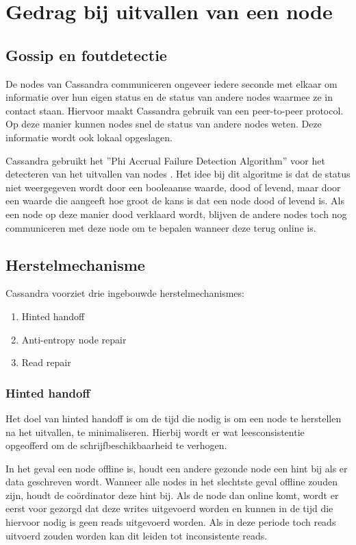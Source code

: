 \chapter{Gedrag bij uitvallen van een node}
\label{ch:cassandra_uitval}

\section{Gossip en foutdetectie}
De nodes van Cassandra communiceren ongeveer iedere seconde met elkaar om informatie over hun eigen status en de status van andere nodes waarmee ze in contact staan.
Hiervoor maakt Cassandra gebruik van een peer-to-peer protocol.
Op deze manier kunnen nodes snel de status van andere nodes weten.
Deze informatie wordt ook lokaal opgeslagen.

Cassandra gebruikt het ''Phi Accrual Failure Detection Algorithm'' voor het detecteren van het uitvallen van nodes \citep{kan2014cassandra}.
Het idee bij dit algoritme is dat de status niet weergegeven wordt door een booleaanse waarde, dood of levend, maar door een waarde die aangeeft hoe groot de kans is dat een node dood of levend is.
Als een node op deze manier dood verklaard wordt, blijven de andere nodes toch nog communiceren met deze node om te bepalen wanneer deze terug online is.

\section{Herstelmechanisme}
Cassandra voorziet drie ingebouwde herstelmechanismes:

\begin{enumerate}
	\item Hinted handoff
	\item Anti-entropy node repair
	\item Read repair
\end{enumerate}

\subsection{Hinted handoff}
Het doel van hinted handoff is om de tijd die nodig is om een node te herstellen na het uitvallen, te minimaliseren.
Hierbij wordt er wat leesconsistentie opgeofferd om de schrijfbeschikbaarheid te verhogen.

In het geval een node offline is, houdt een andere gezonde node een hint bij als er data geschreven wordt.
Wanneer alle nodes in het slechtste geval offline zouden zijn, houdt de coördinator deze hint bij.
Als de node dan online komt, wordt er eerst voor gezorgd dat deze writes uitgevoerd worden en kunnen in de tijd die hiervoor nodig is geen reads uitgevoerd worden.
Als in deze periode toch reads uitvoerd zouden worden kan dit leiden tot inconsistente reads.

